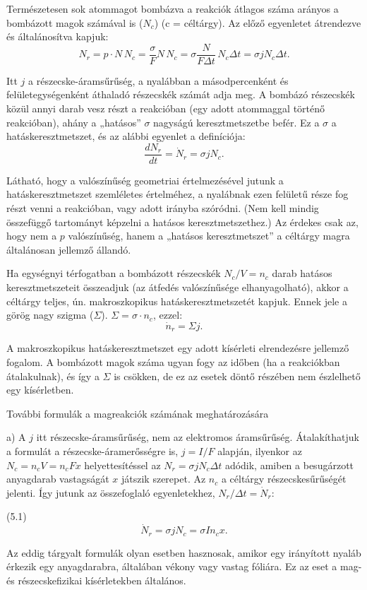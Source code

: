 \documentclass[a4paper,12pt]{article}
\begin{document}
Természetesen sok atommagot bombázva a reakciók átlagos száma arányos
a bombázott magok számával is ($N_c$) (c = céltárgy).
Az előző egyenletet átrendezve és általánosítva kapjuk:
\[
N_r = p\cdot N\,N_c = \frac{\sigma}{F }N\,N_c
= \sigma\frac{N}{F \Delta t}\,N_c \Delta t = \sigma j N_c \Delta t.
\]

Itt $j$ a részecske-áramsűrűség, a nyalábban a másodpercenként és
felületegységenként áthaladó részecskék számát adja meg.
A bombázó részecskék közül annyi darab vesz részt a reakcióban (egy adott atommaggal történő
reakcióban), ahány a „hatásos” $\sigma$ nagyságú keresztmetszetbe befér.
Ez a $\sigma$ a hatáskeresztmetszet, és az alábbi egyenlet a definíciója:
\[
\frac{dN_r}{dt}=\dot{N}_r=\sigma j N_c.
\]

Látható, hogy a valószínűség geometriai értelmezésével jutunk a
hatáskeresztmetszet szemléletes értelméhez, a nyalábnak ezen felületű
része fog részt venni a reakcióban, vagy adott irányba szóródni.
(Nem kell mindig összefüggő tartományt képzelni a hatásos keresztmetszethez.)
Az érdekes csak az, hogy nem a $p$ valószínűség, hanem a „hatásos
keresztmetszet” a céltárgy magra általánosan jellemző állandó.

Ha egységnyi térfogatban a bombázott részecskék $N_c/V=n_c$ darab
hatásos keresztmetszeteit összeadjuk (az átfedés valószínűsége
elhanyagolható), akkor a céltárgy teljes, ún. makroszkopikus
hatáskeresztmetszetét kapjuk.
Ennek jele a görög nagy szigma ($\Sigma$).
$\Sigma=\sigma\cdot n_c$, ezzel:
\[
\dot{n}_r=\Sigma j.
\]

A makroszkopikus hatáskeresztmetszet egy adott kísérleti elrendezésre
jellemző fogalom.
A bombázott magok száma ugyan fogy az időben (ha a reakciókban
átalakulnak), és így a $\Sigma$ is csökken, de ez az esetek döntő részében
nem észlelhető egy kísérletben.

További formulák a magreakciók számának meghatározására

a) A $j$ itt részecske-áramsűrűség, nem az elektromos áramsűrűség.
Átalakíthatjuk a formulát a részecske-áramerősségre is, $j=I/F$ alapján,
ilyenkor az $N_c=n_c V=n_c F x$ helyettesítéssel az
$N_r=\sigma j N_c \Delta t$ adódik, amiben a besugárzott anyagdarab
vastagságát $x$ játszik szerepet.
Az $n_c$ a céltárgy részecskesűrűségét jelenti.
Így jutunk az összefoglaló egyenletekhez, $N_r/\Delta t=\dot{N}_r$:

(5.1)
\[
\dot{N}_r=\sigma j N_c=\sigma I n_c x.
\]

Az eddig tárgyalt formulák olyan esetben hasznosak, amikor egy
irányított nyaláb érkezik egy anyagdarabra, általában vékony vagy vastag
fóliára.
Ez az eset a mag- és részecskefizikai kísérletekben általános.
\end{document}
